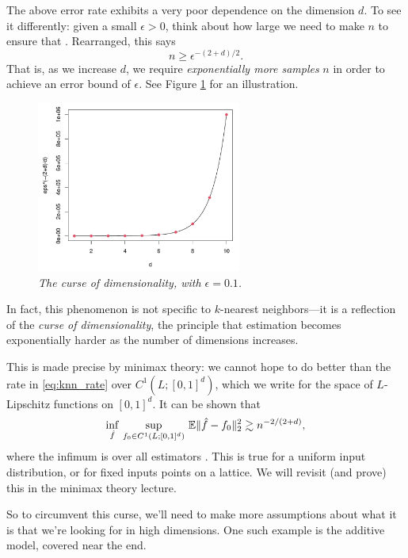 \documentclass{article}
\begin{document}
The above error rate  exhibits a very poor dependence on
the dimension $d$. To see it differently: given a small $\epsilon>0$, think
about how large we need to make $n$ to ensure that . Rearranged, this says 
\[
n \geq \epsilon^{-(2+d)/2}.
\] 
That is, as we increase $d$, we require \emph{exponentially more samples} $n$ in
order to achieve an error bound of $\epsilon$. See Figure \ref{fig:curse} for an
illustration.

\begin{figure}[tb]
\centering
\includegraphics[width=0.6\textwidth]{curse.pdf}
\caption{\it The curse of dimensionality, with $\epsilon=0.1$.} 
\label{fig:curse}
\end{figure}

In fact, this phenomenon is not specific to $k$-nearest neighbors---it is a 
reflection of the \emph{curse of dimensionality}, the principle that estimation
becomes exponentially harder as the number of dimensions increases. 

This is made precise by minimax theory: we cannot hope to do better than the
rate in \eqref{eq:knn_rate} over $C^1(L; [0,1]^d)$, which we write for the space 
of $L$-Lipschitz functions on $[0,1]^d$. It can be shown that
\begin{equation}
\label{eq:lipschitz_lbd}
\inf_{\hat{f}} \, \sup_{f_0 \in C^1(L; [0,1]^d)} \, \mathbb{E}\|\hat{f} - f_0\|_2^2   
\gtrsim n^{-2/(2+d)},
\end{equation}
where the infimum is over all estimators \smash{$\hf$}. This is true for a
uniform input distribution, or for fixed inputs points on a lattice. We will 
revisit (and prove) this in the minimax theory lecture.    

So to circumvent this curse, we'll need to make more assumptions about what it
is that we're looking for in high dimensions. One such example is the additive
model, covered near the end.
\end{document}
